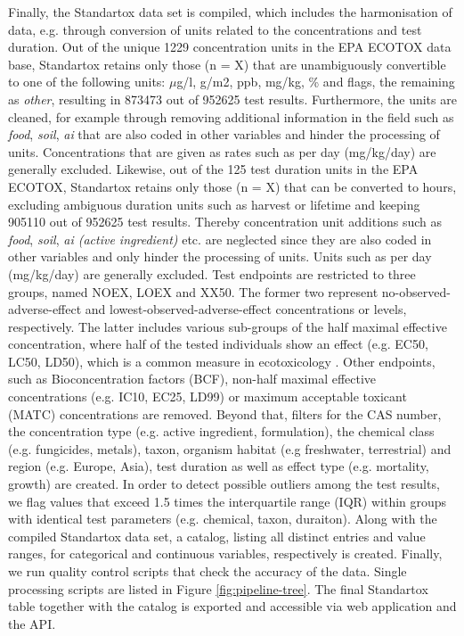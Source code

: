 Finally, the Standartox data set is compiled, which includes the harmonisation of data, e.g. through conversion of units related to the concentrations and test duration. Out of the unique 1229 concentration units in the EPA ECOTOX data base, Standartox retains only those (n = X) that are unambiguously convertible to one of the following units: $\mu$g/l, g/m2, ppb, mg/kg, \% and flags, the remaining as \textit{other}, resulting in 873473 out of 952625 test results. Furthermore, the units are cleaned, for example through removing additional information in the field such as \textit{food}, \textit{soil}, \textit{ai} that are also coded in other variables and hinder the processing of units. Concentrations that are given as rates such as per day (mg/kg/day) are generally excluded.
Likewise, out of the 125 test duration units in the EPA ECOTOX, Standartox retains only those (n = X) that can be converted to hours, excluding ambiguous duration units such as harvest or lifetime and keeping 905110 out of 952625 test results. Thereby concentration unit additions such as \textit{food}, \textit{soil}, \textit{ai (active ingredient)} etc. are neglected since they are also coded in other variables and only hinder the processing of units. Units such as per day (mg/kg/day) are generally excluded. Test endpoints are restricted to three groups, named NOEX, LOEX and XX50. The former two represent no-observed-adverse-effect and lowest-observed-adverse-effect concentrations or levels, respectively. The latter includes various sub-groups of the half maximal effective concentration, where half of the tested individuals show an effect (e.g. EC50, LC50, LD50), which is a common measure in ecotoxicology \citep{malaj_organic_2014}. Other endpoints, such as Bioconcentration factors (BCF), non-half maximal effective concentrations (e.g. IC10, EC25, LD99) or maximum acceptable toxicant (MATC) concentrations are removed. Beyond that, filters for the CAS number, the concentration type (e.g. active ingredient, formulation), the chemical class (e.g. fungicides, metals), taxon, organism habitat (e.g freshwater, terrestrial) and region (e.g. Europe, Asia), test duration as well as effect type (e.g. mortality, growth) are created. In order to detect possible outliers among the test results, we flag values that exceed 1.5 times the interquartile range (IQR) within groups with identical test parameters (e.g. chemical, taxon, duraiton). Along with the compiled Standartox data set, a catalog, listing all distinct entries and value ranges, for categorical and continuous variables, respectively is created. Finally, we run quality control scripts that check the accuracy of the data. Single processing scripts are listed in Figure \ref{fig:pipeline-tree}. The final Standartox table together with the catalog is exported and accessible via web application and the API.

